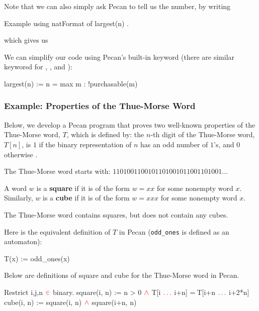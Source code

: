 Note that we can also simply ask Pecan to tell us the number, by writing
\begin{pecan}
Example using natFormat of { largest(n) }.
\end{pecan}
which gives us
\begin{pecan_output}
[(n,43)]
\end{pecan_output}

We can simplify our code using Pecan's built-in  keyword (there are similar keyworsd for , , and ):
\begin{pecan}
largest(n) := n = max { m : !purchasable(m) }
\end{pecan}

\subsubsection*{Example: Properties of the Thue-Morse Word}

Below, we develop a Pecan program that proves two well-known properties of the Thue-Morse word, $T$, which is defined by: the $n$-th digit of the Thue-Morse word, $T[n]$, is $1$ if the binary representation of $n$ has an odd number of $1$'s, and $0$ otherwise \cite{auto_seq}.

The Thue-Morse word starts with: $1101001100101101001011001101001\ldots$
\begin{definition}
    A word $w$ is a \textbf{square} if it is of the form $w = xx$ for some nonempty word $x$.
    Similarly, $w$ is a \textbf{cube} if it is of the form $w = xxx$ for some nonempty word $x$.
\end{definition}

\begin{theorem}\cite{auto_seq}
    The Thue-Morse word contains squares, but does not contain any cubes.
\end{theorem}

Here is the equivalent definition of $T$ in Pecan (\texttt{odd\_ones} is defined as an automaton):
\begin{pecan}
T(x) := odd_ones(x)
\end{pecan}

Below are definitions of square and cube for the Thue-Morse word in Pecan.

\begin{pecan}
Restrict i,j,n $\color{red} \in$ binary.
square(i, n) := n > 0 $\color{red} \wedge$ T[i $\color{red} \ldots$ i+n] =$\ $T[i+n $\color{red} \ldots$ i+2*n]
cube(i, n) := square(i, n) $\color{red} \wedge$ square(i+n, n)
\end{pecan}


